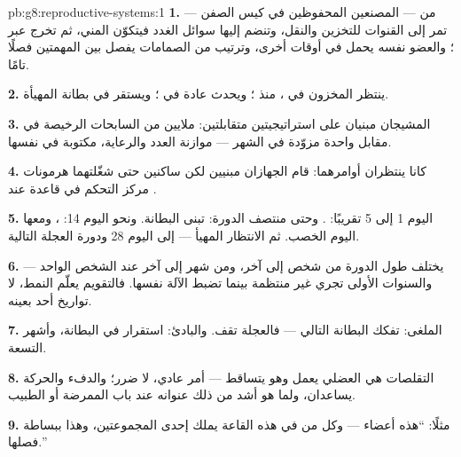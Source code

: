 \begin{solution}{pb:g8:reproductive-systems:1}
\textbf{1.} من  --- المصنعين المحفوظين في كيس
الصفن --- تمر  إلى القنوات للتخزين والنقل، وتنضم
إليها سوائل الغدد فيتكوّن المني، ثم تخرج عبر ؛
والعضو نفسه يحمل  في أوقات أخرى، وترتيب من الصمامات
يفصل بين المهمتين فصلًا تامًا.

\textbf{2.} ينتظر المخزون في ، منذ ؛ ويحدث 
عادة في ؛ ويستقر  في بطانة 
المهيأة.

\textbf{3.} المشيجان مبنيان على استراتيجيتين متقابلتين: ملايين من
السابحات الرخيصة في مقابل  واحدة مزوّدة في الشهر ---
موازنة العدد والرعاية، مكتوبة في  نفسها.

\textbf{4.} كانا ينتظران أوامرهما: قام الجهازان مبنيين لكن ساكنين
حتى شغّلتهما هرمونات مركز التحكم في قاعدة  عند
.

\textbf{5.} اليوم 1 إلى 5 تقريبًا: . وحتى منتصف الدورة: تبنى
البطانة. ونحو اليوم 14: ، ومعها اليوم الخصب.
ثم الانتظار المهيأ --- إلى اليوم 28 ودورة العجلة
التالية.

\textbf{6.} يختلف طول الدورة من شخص إلى آخر، ومن شهر إلى آخر عند
الشخص الواحد --- والسنوات الأولى تجري غير منتظمة بينما
تضبط الآلة نفسها. فالتقويم يعلّم النمط، لا تواريخ أحد
بعينه.

\textbf{7.} الملغى: تفكك البطانة  التالي --- فالعجلة تقف.
والبادئ: استقرار  في البطانة، وأشهر 
التسعة.

\textbf{8.} التقلصات هي  العضلي يعمل وهو يتساقط --- أمر عادي،
لا ضرر؛ والدفء والحركة يساعدان، ولما هو أشد من ذلك
عنوانه عند باب الممرضة أو الطبيب.

\textbf{9.} مثلًا: ``هذه أعضاء   --- وكل من في هذه
القاعة يملك إحدى المجموعتين، وهذا ببساطة فصلها.''


\end{solution}
